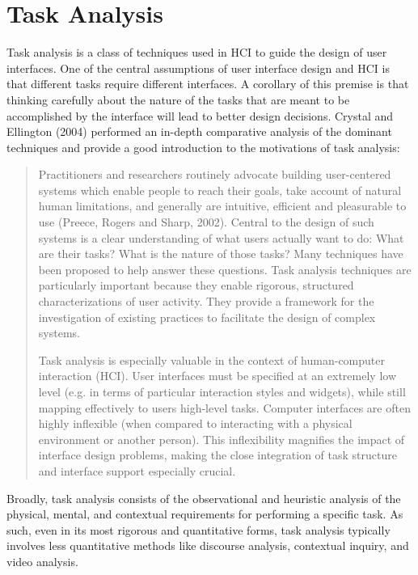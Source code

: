 \section{Task Analysis}

Task analysis is a class of techniques used in HCI to guide the design of user interfaces. One of the central assumptions of user interface design and HCI is that different tasks require different interfaces. A corollary of this premise is that thinking carefully about the nature of the tasks that are meant to be accomplished by the interface will lead to better design decisions. Crystal and Ellington (2004) performed an in-depth comparative analysis of the dominant techniques and provide a good introduction to the motivations of task analysis:

\begin{quote}
Practitioners and researchers routinely advocate building user-centered systems which enable people to reach their goals, take account of natural human limitations, and generally are intuitive, efficient and pleasurable to use (Preece, Rogers and Sharp, 2002). Central to the design of such systems is a clear understanding of what users actually want to do: What are their tasks? What is the nature of those tasks? Many techniques have been proposed to help answer these questions. Task analysis techniques are particularly important because they enable rigorous, structured characterizations of user activity. They provide a framework for the investigation of existing practices to facilitate the design of complex systems.

Task analysis is especially valuable in the context of human-computer interaction (HCI). User interfaces must be specified at an extremely low level (e.g. in terms of particular interaction styles and widgets), while still mapping effectively to users high-level tasks. Computer interfaces are often highly inflexible (when compared to interacting with a physical environment or another person). This inflexibility magnifies the impact of interface design problems, making the close integration of task structure and interface support especially crucial. \cite{crystal2004}
\end{quote}

Broadly, task analysis consists of the observational and heuristic analysis of the physical, mental, and contextual requirements for performing a specific task. As such, even in its most rigorous and quantitative forms, task analysis typically involves less quantitative methods like discourse analysis, contextual inquiry, and video analysis. 


